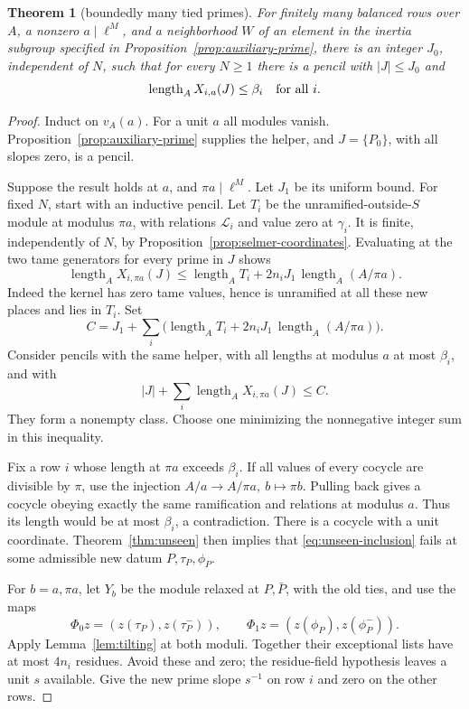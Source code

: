 \documentclass[11pt,a4paper]{article}
\newtheorem{theorem}{Theorem}[section]
\theoremstyle{definition}
\newcommand{\length}{\operatorname{length}}
\begin{document}
\begin{theorem}[boundedly many tied primes]\label{thm:bounded-pencil}
For finitely many balanced rows over \(A\), a nonzero
\(a\mid\ell^M\), and a neighborhood \(W\) of an element
in the inertia subgroup specified in
Proposition~\ref{prop:auxiliary-prime}, there is an integer
\(J_0\), independent of \(N\), such that for every \(N\ge1\)
there is a pencil with \(|J|\le J_0\) and
\[
 \length_A X_{i,a}(J)\le\beta_i\quad\hbox{for all }i.
\]
\end{theorem}
\begin{proof}
Induct on \(v_A(a)\). For a unit \(a\) all modules
vanish. Proposition~\ref{prop:auxiliary-prime} supplies
the helper, and \(J=\{P_0\}\), with all slopes zero,
is a pencil.

Suppose the result holds at \(a\), and \(\pi a\mid\ell^M\).
Let \(J_1\) be its uniform bound.
For fixed \(N\), start with an inductive pencil.
Let \(T_i\) be the unramified-outside-\(S\) module
at modulus \(\pi a\), with relations \(\mathcal L_i\)
and value zero at \(\gamma_i\).
It is finite, independently of \(N\), by
Proposition~\ref{prop:selmer-coordinates}.
Evaluating at the two tame generators for every
prime in \(J\) shows
\[
 \length_A X_{i,\pi a}(J)
       \le\length_A T_i+
                2n_iJ_1\,\length_A(A/\pi a).
\]
Indeed the kernel has zero tame values, hence is
unramified at all these new places and lies in \(T_i\).
Set
\[
 C=J_1+\sum_i
       \bigl(\length_A T_i+
              2n_iJ_1\,\length_A(A/\pi a)\bigr).
\]
Consider pencils with the same helper, with all
lengths at modulus \(a\) at most \(\beta_i\), and
with
\[
 |J|+\sum_i\length_A X_{i,\pi a}(J)\le C .
\]
They form a nonempty class. Choose one minimizing the
nonnegative integer sum in this inequality.

Fix a row \(i\) whose length at \(\pi a\) exceeds
\(\beta_i\). If all values of every cocycle are
divisible by \(\pi\), use the injection
\(A/a\to A/\pi a,\ b\mapsto\pi b\).
Pulling back gives a cocycle obeying exactly the
same ramification and relations at modulus \(a\).
Thus its length would be at most \(\beta_i\), a
contradiction. There is a cocycle with a unit
coordinate. Theorem~\ref{thm:unseen} then implies
that \eqref{eq:unseen-inclusion} fails at some
admissible new datum \(P,\tau_P,\phi_P\).

For \(b=a,\pi a\), let \(Y_b\) be the module relaxed
at \(P,\bar P\), with the old ties, and use the maps
\[
 \Phi_0z=(z(\tau_P),z(\tau_P^-)),\qquad
 \Phi_1z=(z(\phi_P),z(\phi_P^-)).
\]
Apply Lemma~\ref{lem:tilting} at both moduli.
Together their exceptional lists have at most \(4n_i\)
residues. Avoid these and zero; the residue-field
hypothesis leaves a unit \(s\) available.
Give the new prime slope \(s^{-1}\) on row \(i\)
and zero on the other rows.


\end{proof}
\end{document}
